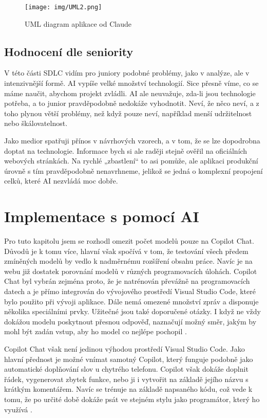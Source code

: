 \documentclass[FM,DP]{tulthesis}
\begin{document}
		\begin{figure}[H]
			\centering
			\texttt{[image: img/UML2.png]}
			\caption{UML diagram aplikace od Claude \cite{general}}
			\label{fig:claude_uml}
		\end{figure}
		
		\subsection{Hodnocení dle seniority}
		V této části SDLC vidím pro juniory podobné problémy, jako v analýze, ale v intenzivnější formě. AI vypíše velké množství technologií. Sice přesně víme, co se máme naučit, abychom projekt zvládli. AI ale neuvažuje, zda-li jsou technologie potřeba, a to junior pravděpodobně nedokáže vyhodnotit. Neví, že něco neví, a z toho plynou větší problémy, než když pouze neví, například menší udržitelnost nebo škálovatelnost.
		
		Jako medior spatřuji přínos v návrhových vzorech, a v tom, že se lze dopodrobna doptat na technologie. Informace bych si ale raději stejně ověřil na oficiálních webových stránkách. Na rychlé „zbastlení“ to asi pomůže, ale aplikaci produkční úrovně s tím pravděpodobně nenavrhneme, jelikož se jedná o komplexní propojení celků, které AI nezvládá moc dobře.
		
		\section{Implementace s pomocí AI}
		Pro tuto kapitolu jsem se rozhodl omezit počet modelů pouze na Copilot Chat. Důvodů je k tomu více, hlavní však spočívá v tom, že testování všech předem zmíněných modelů by vedlo k nadměrnému rozšíření obsahu práce. Navíc je na webu již dostatek porovnání modelů v různých programovacích úlohách. Copilot Chat byl vybrán zejména proto, že je natrénován převážně na programovacích datech a je přímo integrován do vývojového prostředí Visual Studio Code, které bylo použito při vývoji aplikace. Dále nemá omezené množství zpráv a disponuje několika speciálními prvky. Užitečné jsou také doporučené otázky. I když ne vždy dokážou modelu poskytnout přesnou odpověď, naznačují možný směr, jakým by mohl být zadán vstup, aby ho model co nejlépe pochopil \cite{gitCopilot}.
		
		Copilot Chat však není jedinou výhodou prostředí Visual Studio Code. Jako hlavní přednost je možné vnímat samotný Copilot, který funguje podobně jako automatické doplňování slov u chytrého telefonu. Copilot však dokáže doplnit řádek, vygenerovat zbytek funkce, nebo ji i vytvořit na základě jejího názvu s krátkým komentářem. Navíc se trénuje na základě napsaného kódu, což vede k tomu, že po určité době dokáže psát ve stejném stylu jako programátor, který ho využívá \cite{gitCopilot}. 
		
\end{document}
